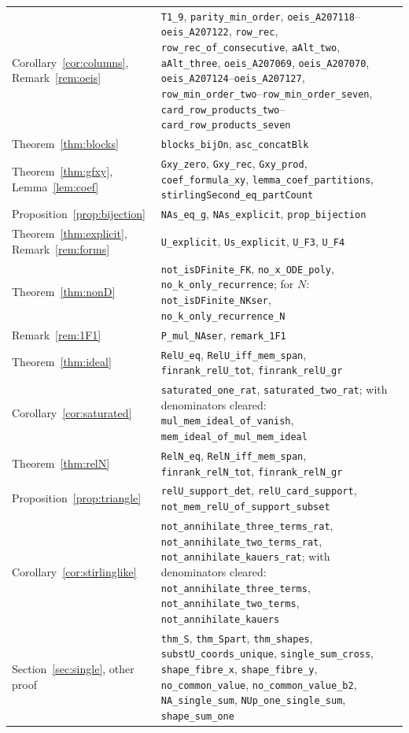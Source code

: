 \documentclass[11pt]{amsart}
\theoremstyle{definition}
\newcommand{\lean}[1]{\texttt{#1}}
\begin{document}
\begin{table}[t]
\begin{tabular}{l>{\raggedright\arraybackslash}p{}}
Corollary~\ref{cor:columns}, Remark~\ref{rem:oeis} & \lean{T1\_9}, \lean{parity\_min\_order}, \lean{oeis\_A207118}--\lean{oeis\_A207122}, \lean{row\_rec}, \lean{row\_rec\_of\_consecutive}, \lean{aAlt\_two}, \lean{aAlt\_three}, \lean{oeis\_A207069}, \lean{oeis\_A207070}, \lean{oeis\_A207124}--\lean{oeis\_A207127}, \lean{row\_min\_order\_two}--\lean{row\_min\_order\_seven}, \lean{card\_row\_products\_two}--\lean{card\_row\_products\_seven}\\
Theorem~\ref{thm:blocks} & \lean{blocks\_bijOn}, \lean{asc\_concatBlk}\\
Theorem~\ref{thm:gfxy}, Lemma~\ref{lem:coef} & \lean{Gxy\_zero}, \lean{Gxy\_rec}, \lean{Gxy\_prod}, \lean{coef\_formula\_xy}, \lean{lemma\_coef\_partitions}, \lean{stirlingSecond\_eq\_partCount}\\
Proposition~\ref{prop:bijection} & \lean{NAs\_eq\_g}, \lean{NAs\_explicit}, \lean{prop\_bijection}\\
Theorem~\ref{thm:explicit}, Remark~\ref{rem:forms} & \lean{U\_explicit}, \lean{Us\_explicit}, \lean{U\_F3}, \lean{U\_F4}\\
Theorem~\ref{thm:nonD} & \lean{not\_isDFinite\_FK}, \lean{no\_x\_ODE\_poly}, \lean{no\_k\_only\_recurrence}; for $N$: \lean{not\_isDFinite\_NKser}, \lean{no\_k\_only\_recurrence\_N}\\
Remark~\ref{rem:1F1} & \lean{P\_mul\_NAser}, \lean{remark\_1F1}\\
Theorem~\ref{thm:ideal} & \lean{RelU\_eq}, \lean{RelU\_iff\_mem\_span}, \lean{finrank\_relU\_tot}, \lean{finrank\_relU\_gr}\\
Corollary~\ref{cor:saturated} & \lean{saturated\_one\_rat}, \lean{saturated\_two\_rat}; with denominators cleared: \lean{mul\_mem\_ideal\_of\_vanish}, \lean{mem\_ideal\_of\_mul\_mem\_ideal}\\
Theorem~\ref{thm:relN} & \lean{RelN\_eq}, \lean{RelN\_iff\_mem\_span}, \lean{finrank\_relN\_tot}, \lean{finrank\_relN\_gr}\\
Proposition~\ref{prop:triangle} & \lean{relU\_support\_det}, \lean{relU\_card\_support}, \lean{not\_mem\_relU\_of\_support\_subset}\\
Corollary~\ref{cor:stirlinglike} & \lean{not\_annihilate\_three\_terms\_rat}, \lean{not\_annihilate\_two\_terms\_rat}, \lean{not\_annihilate\_kauers\_rat}; with denominators cleared: \lean{not\_annihilate\_three\_terms}, \lean{not\_annihilate\_two\_terms}, \lean{not\_annihilate\_kauers}\\
Section~\ref{sec:single}, other proof & \lean{thm\_S}, \lean{thm\_Spart}, \lean{thm\_shapes}, \lean{substU\_coords\_unique}, \lean{single\_sum\_cross}, \lean{shape\_fibre\_x}, \lean{shape\_fibre\_y}, \lean{no\_common\_value}, \lean{no\_common\_value\_b2}, \lean{NA\_single\_sum}, \lean{NUp\_one\_single\_sum}, \lean{shape\_sum\_one}\\

\end{tabular}
\end{table}
\end{document}
